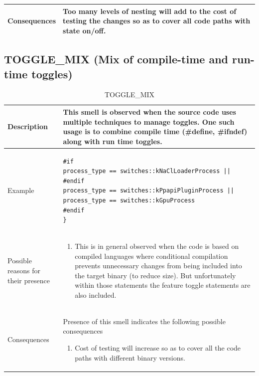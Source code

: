 \documentclass[conference]{IEEEtran}
\begin{document}
\begin{table}[!h]
\begin{tabular}{|p{1.5cm}|p{6.6cm}|}
 \\ \hline
 Consequences & Too many levels of nesting will add to the cost of testing the changes so as to cover all code paths with state on/off.
 \\ \hline

 
\end{tabular}
\label{table:nested-toggle}
\end{table}

\subsection{TOGGLE\_MIX (Mix of compile-time and run-time toggles)}

\begin{table}[!h]
\caption{TOGGLE\_MIX}
\centering
\begin{tabular}{|p{1.5cm}|p{6.6cm}|}
 \hline\hline
 Description & This smell is observed when the source code uses multiple techniques to manage toggles. One such usage is to combine compile time (\#define, \#ifndef) along with run time toggles.  \\ \hline

 Example & 
 \begin{lstlisting}
#if
process_type == switches::kNaClLoaderProcess ||
#endif
process_type == switches::kPpapiPluginProcess ||
process_type == switches::kGpuProcess
#endif
}
 \end{lstlisting}
 
 \\ \hline

Possible reasons for their presence & 
\begin{enumerate}
	\item This is in general observed when the code is based on compiled languages where conditional compilation prevents unnecessary changes from being included into the target binary (to reduce size). But unfortunately within those statements the feature toggle statements are also included.
\end{enumerate}	 
 \\ \hline
 Consequences & 
 Presence of this smell indicates the following possible consequences
 \begin{enumerate}
	\item Cost of testing will increase so as to cover all the code paths with different binary versions.
\end{enumerate}
 \\ \hline

\end{tabular}
\label{table:mix-toggle}
\end{table}
\end{document}
